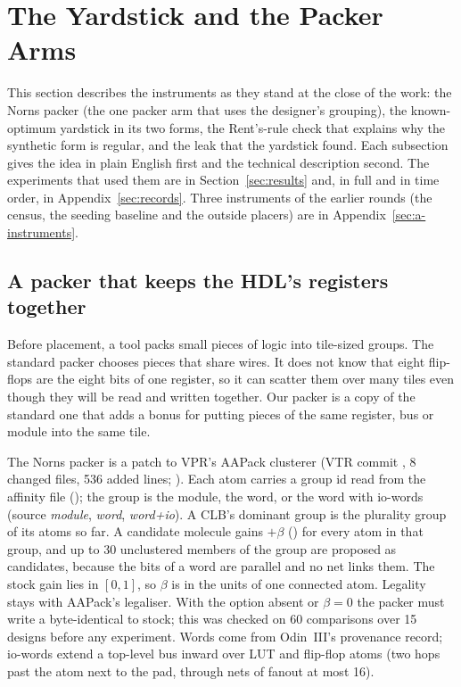 \section{The Yardstick and the Packer Arms}
\label{sec:innovations}

This section describes the instruments as they stand at the close of the work: the Norns packer (the one packer arm that uses the designer's grouping), the known-optimum yardstick in its two forms, the Rent's-rule check that explains why the synthetic form is regular, and the leak that the yardstick found. Each subsection gives the idea in plain English first and the technical description second. The experiments that used them are in Section~\ref{sec:results} and, in full and in time order, in Appendix~\ref{sec:records}. Three instruments of the earlier rounds (the census, the seeding baseline and the outside placers) are in Appendix~\ref{sec:a-instruments}.

\subsection{A packer that keeps the HDL's registers together}
\label{sec:i-packer}

 Before placement, a tool packs small pieces of logic into tile-sized groups. The standard packer chooses pieces that share wires. It does not know that eight flip-flops are the eight bits of one register, so it can scatter them over many tiles even though they will be read and written together. Our packer is a copy of the standard one that adds a bonus for putting pieces of the same register, bus or module into the same tile.

 The Norns packer is a patch to VPR's AAPack clusterer (VTR commit , 8 changed files, 536 added lines; ). Each atom carries a group id read from the affinity file (); the group is the module, the word, or the word with io-words (source \emph{module}, \emph{word}, \emph{word+io}). A CLB's dominant group is the plurality group of its atoms so far. A candidate molecule gains $+\beta$ () for every atom in that group, and up to 30 unclustered members of the group are proposed as candidates, because the bits of a word are parallel and no net links them. The stock gain lies in $[0,1]$, so $\beta$ is in the units of one connected atom. Legality stays with AAPack's legaliser. With the option absent or $\beta=0$ the packer must write a  byte-identical to stock; this was checked on 60 comparisons over 15 designs before any experiment. Words come from Odin~III's provenance record; io-words extend a top-level bus inward over LUT and flip-flop atoms (two hops past the atom next to the pad, through nets of fanout at most 16).

